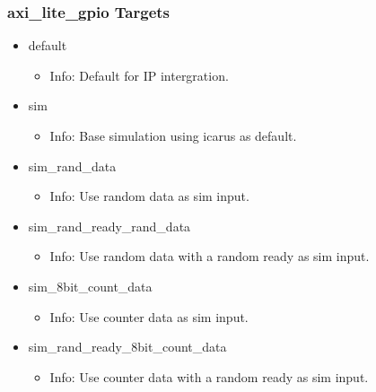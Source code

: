 \subsubsection{axi\_lite\_gpio Targets}
\begin{itemize}
\item default
	\begin{itemize}
	\item[$\space$] Info: Default for IP intergration.
	\end{itemize}
\item sim
	\begin{itemize}
	\item[$\space$] Info: Base simulation using icarus as default.
	\end{itemize}
\item sim\_rand\_data
	\begin{itemize}
	\item[$\space$] Info: Use random data as sim input.
	\end{itemize}
\item sim\_rand\_ready\_rand\_data
	\begin{itemize}
	\item[$\space$] Info: Use random data with a random ready as sim input.
	\end{itemize}
\item sim\_8bit\_count\_data
	\begin{itemize}
	\item[$\space$] Info: Use counter data as sim input.
	\end{itemize}
\item sim\_rand\_ready\_8bit\_count\_data
	\begin{itemize}
	\item[$\space$] Info: Use counter data with a random ready as sim input.
	\end{itemize}
\end{itemize}

